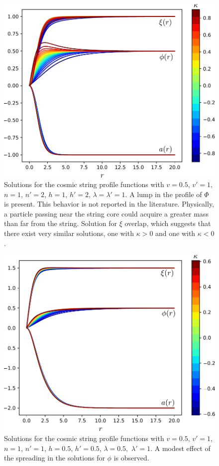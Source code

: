 \begin{figure}
	\centering
	\includegraphics[scale=1]{./figures/Figure_1.pdf}
	\caption{Solutions for the cosmic string profile functions with $v = 0.5$, $v'=1$, $n=1$, $n'=2$, $h=1$, $h'=2$, $\lambda=\lambda'=1$. A lump in the profile of $\Phi$ is present. This behavior is not reported in the literature. Physically, a particle passing near the string core could acquire a greater mass than far from the string. Solution for $\xi$ overlap, which suggests that there exist very similar solutions, one with $\kappa>0$ and one with $\kappa < 0$.}
	\label{fig:fig2}
\end{figure}

\begin{figure}
	\centering
	\includegraphics[scale=1]{./figures/Figure_2.pdf}
	\caption{Solutions for the cosmic string profile functions with $v = 0.5$, $v'=1$, $n=1$, $n'=1$, $h=0.5$, $h'=0.5$, $\lambda=0.5,$ $\lambda'=1$. A modest effect of the spreading in the solutions for $\phi$ is observed.}
	\label{fig:fig3}
\end{figure}


